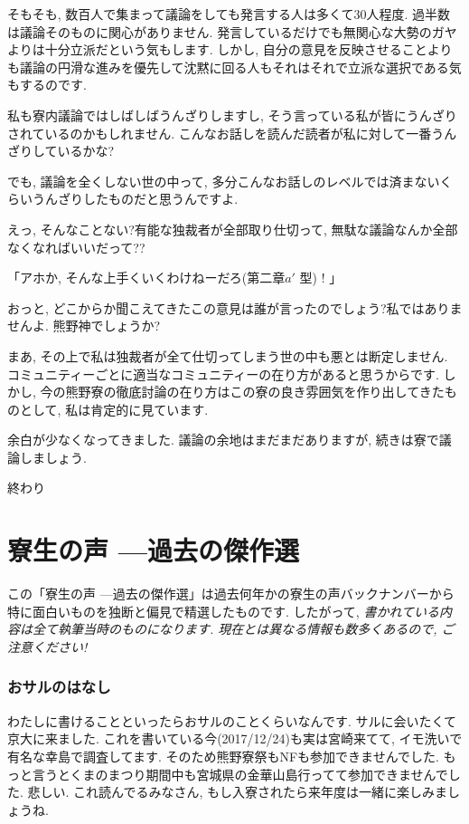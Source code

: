 \documentclass[10pt,b5jsbook,dvips,dvipdfmx,openany]{jsbook}
\theoremstyle{definition}
\begin{document}
		そもそも, 数百人で集まって議論をしても発言する人は多くて30人程度. 過半数は議論そのものに関心がありません. 発言しているだけでも無関心な大勢のガヤよりは十分立派だという気もします. しかし, 自分の意見を反映させることよりも議論の円滑な進みを優先して沈黙に回る人もそれはそれで立派な選択である気もするのです. 

		私も寮内議論ではしばしばうんざりしますし, そう言っている私が皆にうんざりされているのかもしれません. こんなお話しを読んだ読者が私に対して一番うんざりしているかな?

		でも, 議論を全くしない世の中って, 多分こんなお話しのレベルでは済まないくらいうんざりしたものだと思うんですよ. 

		えっ, そんなことない?有能な独裁者が全部取り仕切って, 無駄な議論なんか全部なくなればいいだって??

		「アホか, そんな上手くいくわけねーだろ(第二章$a'$ 型) ! 」

		おっと, どこからか聞こえてきたこの意見は誰が言ったのでしょう?私ではありませんよ. 熊野神でしょうか?

		まあ, その上で私は独裁者が全て仕切ってしまう世の中も悪とは断定しません. コミュニティーごとに適当なコミュニティーの在り方があると思うからです. しかし, 今の熊野寮の徹底討論の在り方はこの寮の良き雰囲気を作り出してきたものとして, 私は肯定的に見ています. 

		余白が少なくなってきました. 議論の余地はまだまだありますが, 続きは寮で議論しましょう. 

		終わり 
	



\chapter{寮生の声 ---過去の傑作選}

\setcounter{footnote}{0}

この「寮生の声 ---過去の傑作選」は過去何年かの寮生の声バックナンバーから特に面白いものを独断と偏見で精選したものです. したがって, \emph{書かれている内容は全て執筆当時のものになります. 現在とは異なる情報も数多くあるので, ご注意ください!} 

		\subsection{おサルのはなし}
		わたしに書けることといったらおサルのことくらいなんです. サルに会いたくて京大に来ました. これを書いている今(2017/12/24)も実は宮崎来てて, イモ洗いで有名な幸島で調査してます. そのため熊野寮祭もNFも参加できませんでした. もっと言うとくまのまつり期間中も宮城県の金華山島行ってて参加できませんでした. 悲しい. これ読んでるみなさん, もし入寮されたら来年度は一緒に楽しみましょうね. 
		
\end{document}
